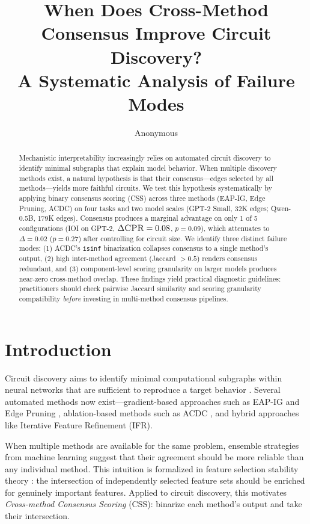 \documentclass[11pt,a4paper]{article}
\title{When Does Cross-Method Consensus Improve Circuit Discovery?\\A Systematic Analysis of Failure Modes}
\author{Anonymous}
\newcommand{\css}{\textsc{CSS}}
\newcommand{\cpr}{\textsc{CPR}}
\begin{document}
\maketitle

\begin{abstract}
Mechanistic interpretability increasingly relies on automated circuit discovery to identify minimal subgraphs that explain model behavior. When multiple discovery methods exist, a natural hypothesis is that their consensus---edges selected by all methods---yields more faithful circuits. We test this hypothesis systematically by applying binary consensus scoring (\css{}) across three methods (EAP-IG, Edge Pruning, ACDC) on four tasks and two model scales (GPT-2 Small, 32K edges; Qwen-0.5B, 179K edges). Consensus produces a marginal advantage on only 1 of 5 configurations (IOI on GPT-2, $\Delta\cpr{}=0.08$, $p=0.09$), which attenuates to $\Delta=0.02$ ($p=0.27$) after controlling for circuit size. We identify three distinct failure modes: (1) ACDC's \texttt{isinf} binarization collapses consensus to a single method's output, (2) high inter-method agreement (Jaccard $>0.5$) renders consensus redundant, and (3) component-level scoring granularity on larger models produces near-zero cross-method overlap. These findings yield practical diagnostic guidelines: practitioners should check pairwise Jaccard similarity and scoring granularity compatibility \emph{before} investing in multi-method consensus pipelines.
\end{abstract}

\section{Introduction}

Circuit discovery aims to identify minimal computational subgraphs within neural networks that are sufficient to reproduce a target behavior \cite{conmy2023towards,wang2023interpretability}. Several automated methods now exist---gradient-based approaches such as EAP-IG \cite{syed2023attribution} and Edge Pruning \cite{bhaskar2024finding}, ablation-based methods such as ACDC \cite{conmy2023towards}, and hybrid approaches like Iterative Feature Refinement (IFR).

When multiple methods are available for the same problem, ensemble strategies from machine learning suggest that their agreement should be more reliable than any individual method. This intuition is formalized in feature selection stability theory \cite{nogueira2016measuring}: the intersection of independently selected feature sets should be enriched for genuinely important features. Applied to circuit discovery, this motivates \emph{Cross-method Consensus Scoring} (\css{}): binarize each method's output and take their intersection.
\end{document}
